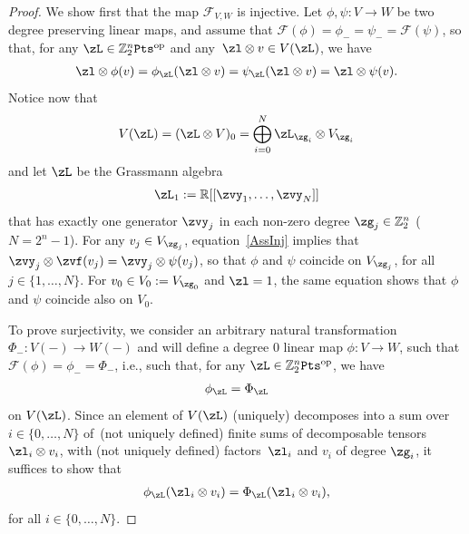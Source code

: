 \documentclass[pdftex]{sigma}%
\newcommand{\op}[1]{\operatorname{#1}}
\newcommand{\R}{{\mathbb R}}
\newcommand{\Z}{{\mathbb Z}}
\def\cF{\mathcal{F}}
\newcommand{\0}{\otimes}
\numberwithin{equation}{section}
\begin{document}
\begin{proof}
We show first that the map $\cF_{ V, W}$ is injective. Let $\phi,\psi\colon V\to W$ be two degree preserving linear maps, and assume that $\cF(\phi)=\phi_-=\psi_-=\cF(\psi)$, so that, for any $\zL\in\Z_2^n{\tt Pts}^{\op{op}}$ and any~$\zl\0 v\in V(\zL)$, we have
\begin{gather}\label{AssInj}
\zl\0 \phi(v)=\phi_\zL(\zl\0 v)=\psi_\zL(\zl\0 v)=\zl\0 \psi(v).
\end{gather}
Notice now that
\[
V(\zL)=(\zL\0 V)_0=\bigoplus_{i=0}^N\zL_{\zg_i}\0 V_{\zg_i}
\]
and let $\zL$ be the Grassmann algebra
\begin{gather}\label{Lambda1}
\zL_1:=\R[[\zvy_1,\dots,\zvy_N]]
\end{gather}
that has exactly one generator $\zvy_j$ in each non-zero degree $\zg_j\in\Z_2^n$ ($N=2^n-1$). For any $v_j\in V_{\zg_j}$, equation~\eqref{AssInj} implies that $\zvy_j \otimes \zvf(v_j)=\zvy_j \otimes\psi(v_j)$, so that $\phi$ and $\psi$ coincide on $ V_{\zg_j}$, for all $j\in\{1,\dots,N\}$. For $v_0\in V_0:= V_{\zg_0}$ and $\zl=1$, the same equation shows that $\phi$ and $\psi$ coincide also on $ V_0$.

To prove surjectivity, we consider an arbitrary natural transformation $\Phi_-\colon V(-)\to W(-)$ and will define a degree 0 linear map $\phi\colon V\to W$, such that $\cF(\phi)=\phi_- =\Phi_-$, i.e., such that, for any $\zL\in\Z_2^n{\tt Pts}^{\op{op}}$, we have
\begin{gather*}%
\phi_\zL=\Phi_\zL
\end{gather*}
on $ V(\zL)$.
Since an element of $ V(\zL)$ (uniquely) decomposes into a sum over $i\in\{0,\dots, N\}$ of~(not uniquely defined) finite sums of decomposable tensors $\zl_i\0 v_i$, with (not uniquely defined) factors~$\zl_i$ and $v_i$ of degree $\zg_i$, it suffices to show that
\begin{gather}\label{CondSurj2}
\phi_\zL(\zl_i\0 v_i)=\Phi_\zL(\zl_i\0 v_i),
\end{gather}
for all $i\in\{0,\dots,N\}$.


\end{proof}
\end{document}
